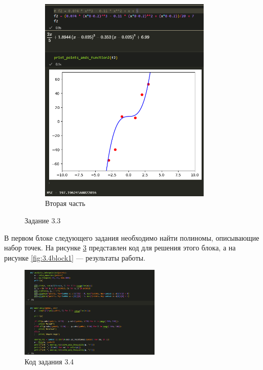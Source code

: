 \documentclass[14pt,a4paper]{extarticle}
\begin{document}
\begin{figure}[h!]
\begin{subfigure}{.5\textwidth}
        \includegraphics[width=0.9\textwidth]{figures/3.3-2.png}
        \caption{Вторая часть}
        \label{fig:3.3.2}
    \end{subfigure}
    \caption{Задание 3.3}
    \label{fig:3.3}
\end{figure}

        В первом блоке следующего задания необходимо найти полиномы,
описывающие набор точек. На рисунке \ref{fig:3.4code} представлен код
для решения этого блока, а на рисунке \ref{fig:3.4block1} --- результаты
работы.

\begin{figure}[h!]
    \centering
    \includegraphics[width=0.6\textwidth]{figures/3.4 code.png}
    \caption{Код задания 3.4}
    \label{fig:3.4code}
\end{figure}
\end{document}
